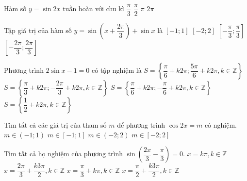 \begin{ex}%
Hàm số $y=\sin 2x$ tuần hoàn với chu kì
	\choice
	{$\dfrac{\pi}{3}$}
	{$\dfrac{\pi}{2}$}
	{\True $\pi$}
	{$2 \pi$}
\end{ex}
\begin{ex}%
Tập giá trị của hàm số $y=\sin \left(x+\dfrac{2 \pi}{3}\right)+\sin x$ là
	\choice
	{\True $\left[ -1; 1 \right]$}
	{$\left[ -2; 2 \right]$}
	{$\left[-\dfrac{\pi}{3} ; \dfrac{\pi}{3}\right]$}
	{$\left[-\dfrac{2 \pi}{3} ; \dfrac{2 \pi}{3}\right]$}
\end{ex}
\begin{ex}%
Phương trình $2 \sin x-1=0$ có tập nghiệm là
	\choice
	{\True $S=\left\{\dfrac{\pi}{6}+k 2 \pi ; \dfrac{5 \pi}{6}+k 2 \pi, k \in \mathbb{Z}\right\}$}
	{$S=\left\{\dfrac{\pi}{3}+k 2 \pi ;-\dfrac{2 \pi}{3}+k 2 \pi, k \in \mathbb{Z}\right\}$}
	{$S=\left\{\dfrac{\pi}{6}+k 2 \pi ;-\dfrac{\pi}{6}+k 2 \pi, k \in \mathbb{Z}\right\}$}
	{$S=\left\{\dfrac{1}{2}+k 2 \pi, k \in \mathbb{Z}\right\}$}
\end{ex}
\begin{ex}%
Tìm tất cả các giá trị của tham số $m$ để phương trình $\cos 2x=m$ có nghiệm.
	\choice
	{$m \in \left( -1; 1 \right)$}
	{\True $m \in \left[ -1; 1 \right]$}
	{$m \in \left( -2; 2 \right)$}
	{$m \in \left[ -2; 2 \right]$}
\end{ex}
\begin{ex}%
Tìm tất cả họ nghiệm của phương trình $\sin \left(\dfrac{2 x}{3}-\dfrac{\pi}{3}\right)=0$.
	\choice
	{$x=k \pi, k \in \mathbb{Z}$}
	{$x=\dfrac{2 \pi}{3}+\dfrac{k 3 \pi}{2}, k \in \mathbb{Z}$}
	{$x=\dfrac{\pi}{3}+k \pi, k \in \mathbb{Z}$}
	{\True $x=\dfrac{\pi}{2}+\dfrac{k 3 \pi}{2}, k \in \mathbb{Z}$}
\end{ex}
